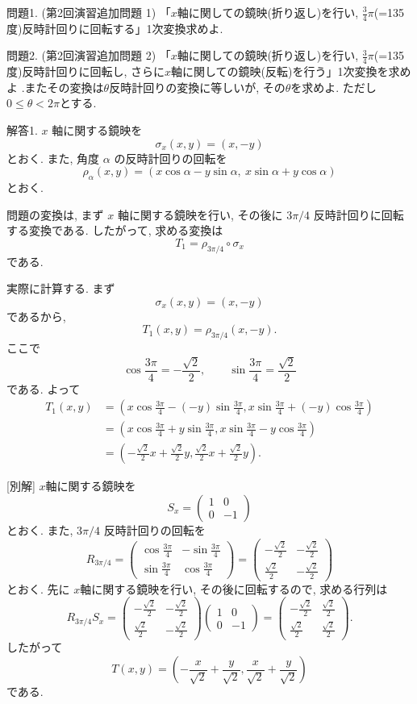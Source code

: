 \documentclass[dvipdfmx,a4paper,11pt]{article} %
\theoremstyle{definition}
\begin{document}
問題1. (第2回演習追加問題 1) 「$x$軸に関しての鏡映(折り返し)を行い, $\frac{3}{4}\pi$(=135度)反時計回りに回転する」1次変換求めよ.

 問題2. (第2回演習追加問題 2) 「$x$軸に関しての鏡映(折り返し)を行い, $\frac{3}{4}\pi$(=135度)反時計回りに回転し, さらに$x$軸に関しての鏡映(反転)を行う」1次変換を求めよ .またその変換は$\theta$反時計回りの変換に等しいが, その$\theta$を求めよ. 
  ただし$0 \le \theta <2\pi$とする. 

解答1.
$x$ 軸に関する鏡映を
\[
\sigma_x(x,y)=(x,-y)
\]
とおく. また, 角度 $\alpha$ の反時計回りの回転を
\[
\rho_\alpha(x,y)
=
(x\cos\alpha-y\sin\alpha,\ x\sin\alpha+y\cos\alpha)
\]
とおく.

問題の変換は, まず $x$ 軸に関する鏡映を行い, その後に
$3\pi/4$ 反時計回りに回転する変換である. したがって, 求める変換は
\[
T_1=\rho_{3\pi/4}\circ \sigma_x
\]
である.

実際に計算する. まず
\[
\sigma_x(x,y)=(x,-y)
\]
であるから,
\[
T_1(x,y)
=
\rho_{3\pi/4}(x,-y).
\]
ここで
\[
\cos\frac{3\pi}{4}=-\frac{\sqrt2}{2},
\qquad
\sin\frac{3\pi}{4}=\frac{\sqrt2}{2}
\]
である. よって
\begin{align*}
T_1(x,y)
&=
\left(
x\cos\frac{3\pi}{4}-(-y)\sin\frac{3\pi}{4},
x\sin\frac{3\pi}{4}+(-y)\cos\frac{3\pi}{4}
\right)
\\
&=
\left(
x\cos\frac{3\pi}{4}+y\sin\frac{3\pi}{4},
x\sin\frac{3\pi}{4}-y\cos\frac{3\pi}{4}
\right)
\\
&=
\left(
-\frac{\sqrt2}{2}x+\frac{\sqrt2}{2}y,
\frac{\sqrt2}{2}x+\frac{\sqrt2}{2}y
\right).
\end{align*}

[別解]
$x$軸に関する鏡映を
\[
S_x=
\begin{pmatrix}
1&0\\
0&-1
\end{pmatrix}
\]
とおく. また, $3\pi/4$ 反時計回りの回転を
\[
R_{3\pi/4}
=
\begin{pmatrix}
\cos\frac{3\pi}{4}&-\sin\frac{3\pi}{4}\\
\sin\frac{3\pi}{4}& \cos\frac{3\pi}{4}
\end{pmatrix}
=
\begin{pmatrix}
-\frac{\sqrt2}{2}&-\frac{\sqrt2}{2}\\
\frac{\sqrt2}{2}&-\frac{\sqrt2}{2}
\end{pmatrix}
\]
とおく. 先に $x$軸に関する鏡映を行い, その後に回転するので, 求める行列は
\[
R_{3\pi/4}S_x
=
\begin{pmatrix}
-\frac{\sqrt2}{2}&-\frac{\sqrt2}{2}\\
\frac{\sqrt2}{2}&-\frac{\sqrt2}{2}
\end{pmatrix}
\begin{pmatrix}
1&0\\
0&-1
\end{pmatrix}
=
\begin{pmatrix}
-\frac{\sqrt2}{2}&\frac{\sqrt2}{2}\\
\frac{\sqrt2}{2}&\frac{\sqrt2}{2}
\end{pmatrix}.
\]
したがって
\[
T(x,y)
=
\left(
-\frac{x}{\sqrt2}+\frac{y}{\sqrt2},
\frac{x}{\sqrt2}+\frac{y}{\sqrt2}
\right)
\]
である.
\end{document}
